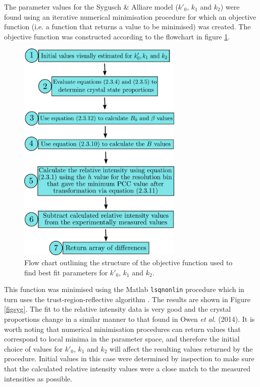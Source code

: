 The parameter values for the Sygusch \& Alliare model ($k'_0$, $k_1$ and $k_2$) were found using an iterative numerical minimisation procedure for which an objective function (i.e. a function that returns a value to be minimised) was created. The objective function was constructed according to the flowchart in figure \ref{figobjfun}.
\begin{figure}
  \centering
    \includegraphics[width=0.7\textwidth]{figures/dwd/objective_function_syg.pdf}
    \caption[Structure of the objective function to determine parameter values for dose decay models.]{Flow chart outlining the structure of the objective function used to find best fit parameters for $k'_0$, $k_1$ and $k_2$.}
    \label{figobjfun}
\end{figure}
This function was minimised using the Matlab \verb+lsqnonlin+ procedure which in turn uses the trust-region-reflective algorithm \cite{coleman1996}.
The results are shown in Figure \ref{figsyg}.
The fit to the relative intensity data is very good and the crystal proportions change in a similar manner to that found in Owen \textit{et al.} (2014).
It is worth noting that numerical minimisation procedures can return values that correspond to local minima in the parameter space, and therefore the initial choice of values for $k'_0$, $k_1$ and $k_2$ will affect the resulting values returned by the procedure.
Initial values in this case were determined by inspection to make sure that the calculated relative intensity values were a close match to the measured intensities as possible.
